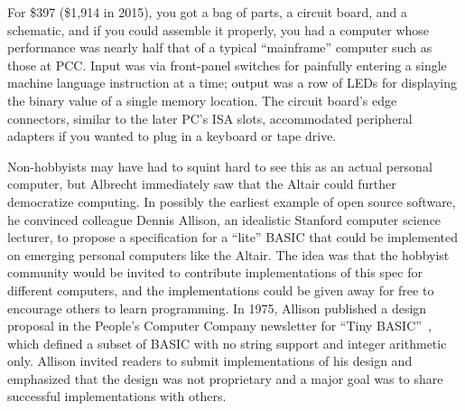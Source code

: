 For \$397 (\$1,914 in 2015), you got a bag of parts, a
circuit board, and a schematic, and if you could assemble it properly, you 
had a computer whose performance was nearly half that of a typical
``mainframe'' computer such as those at PCC.
Input was via
front-panel switches for painfully entering a
single machine language instruction at a time; output was a row of  LEDs for
displaying the binary value of a single memory location.  The circuit board's
edge connectors, similar to the later PC's ISA slots, accommodated 
peripheral adapters if you wanted to plug in a keyboard or tape drive.


Non-hobbyists may have had to squint
hard to see this as an actual personal computer,
but Albrecht
immediately saw that the Altair could  further democratize computing.
In possibly the earliest example of open source software, he
convinced colleague Dennis Allison, an idealistic Stanford computer
science lecturer, to propose a specification for a ``lite'' BASIC that could
be implemented on emerging personal
computers like the Altair.
The idea was that the hobbyist community would be invited to contribute
implementations of this spec for different computers, and the
implementations could be given away for free to encourage others to
learn programming.
In 1975, Allison published a design proposal in the People's Computer
Company newsletter for ``Tiny
BASIC''~\cite{allison_tiny_basic}, which defined 
a subset of BASIC with no string support and integer arithmetic only.
Allison invited readers to submit implementations of his design and
emphasized that the design was not proprietary and a major goal was to
share successful implementations with others.

